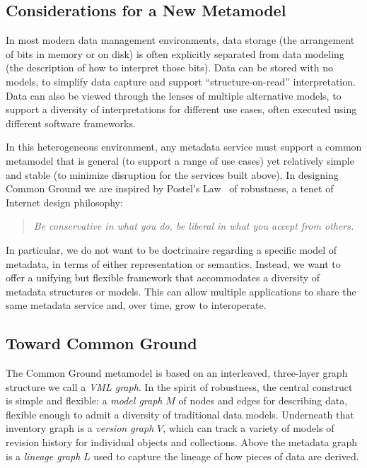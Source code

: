 \documentclass{article}
\newcommand{\vml}{VML\xspace}
\newcommand{\versiongraph}{version graph\xspace}
\newcommand{\modelgraph}{model graph\xspace}
\newcommand{\lineagegraph}{lineage graph\xspace}
\begin{document}
\subsection{Considerations for a New Metamodel}
In most modern data management environments, data storage (the arrangement of bits in memory or on disk) is often explicitly separated from data modeling (the description of how to interpret those bits). Data can be stored with no models, to simplify data capture and support ``structure-on-read'' interpretation.  Data can also be viewed through the lenses of multiple alternative models, to support a diversity of interpretations for different use cases, often executed using different software frameworks.

In this heterogeneous environment, any metadata service must support a common metamodel that is general (to support a range of use cases) yet relatively simple and stable (to minimize disruption for the services built above).  In designing Common Ground we are inspired by Postel's Law~\cite{postel} of robustness, a tenet of Internet design philosophy:
\begin{quote}
\emph{Be conservative in what you do, be liberal in what you accept from others.}
\end{quote}
In particular, we do not want to be doctrinaire regarding a specific model of metadata, in terms of either representation or semantics.  Instead, we want to offer a unifying but flexible framework that 
accommodates a diversity of metadata structures or models.  This can allow multiple applications to share the same metadata service and, over time, grow to interoperate.

\subsection{Toward Common Ground}
The Common Ground metamodel is based on an interleaved, three-layer graph structure we call a \emph{\vml graph}.  In the spirit of robustness, the central construct is simple and flexible: a \emph{\modelgraph} $M$ of nodes and edges for describing data, flexible enough to admit a diversity of traditional data models.
Underneath that inventory graph is a \emph{\versiongraph} $V$, which can track a variety of models 
of revision history for individual objects and collections. Above the metadata graph is a 
\emph{\lineagegraph} $L$ used to capture the lineage of how pieces of data are derived.
\end{document}
